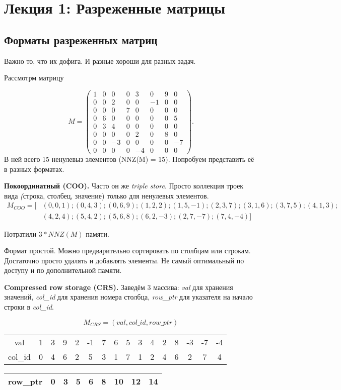 \section{Лекция 1: Разреженные матрицы}

\subsection{Форматы разреженных матриц}

Важно то, что их дофига. И разные хороши для разных задач.

Рассмотрм матрицу 

$$
M=
\begin{pmatrix}
1 & 0 & 0 & 0 & 3 & 0 & 9 & 0 \\
0 & 0 & 2 & 0 & 0 & -1 & 0 & 0 \\
0 & 0 & 0 & 7 & 0 & 0 & 0 & 0 \\
0 & 6 & 0 & 0 & 0 & 0 & 0 & 5 \\
0 & 3 & 4 & 0 & 0 & 0 & 0 & 0 \\
0 & 0 & 0 & 0 & 2 & 0 & 8 & 0 \\
0 & 0 & -3 & 0 & 0 & 0 & 0 & -7 \\
0 & 0 & 0 & 0 & -4 & 0 & 0 & 0 
\end{pmatrix}.
$$
В ней всего 15 ненулевыз элементов (NNZ(M) = 15).
Попробуем представить её в разных форматах.

\textbf{Покоординатный (COO).} Часто он же \textit{triple store}. Просто коллекция троек вида \textit(строка, столбец, значение) только для ненулевых элементов.
\begin{align*}
M_{\textit{COO}} = [&(0,0,1);(0,4,3);(0,6,9);(1,2,2);(1,5,-1);(2,3,7);(3,1,6);(3,7,5);(4,1,3);\\
           &(4,2,4);(5,4,2);(5,6,8); (6,2,-3);(2,7,-7);(7,4,-4) ]
\end{align*}

Потратили $3*NNZ(M)$ памяти.

Формат простой. Можно предварительно сортировать по столбцам или строкам. Достаточно просто удалять и добавлять элементы. Не самый оптимальный по доступу и по дополнительной памяти.

\textbf{Compressed row storage (CRS).} Заведём 3 массива: \textit{val} для хранения значений, \textit{col\_id} для хранения номера столбца, \textit{row\_ptr} для указателя на начало строки в \textit{col\_id}.

\begin{center}
$$
M_{\textit{CRS}} = (\textit{val},\textit{col\_id},\textit{row\_ptr} )
$$
\begin{tabular}{|c||c|c|c|c|c|c|c|c|c|c|c|c|c|c|c|}
\hline
val     & 1 & 3 & 9 & 2 & -1 & 7 & 6 & 5 & 3 & 4 & 2 & 8 & -3 & -7 & -4\\
col\_id & 0 & 4 & 6 & 2 & 5  & 3 & 1 & 7 & 1 & 2 & 4 & 6 & 2  & 7  & 4\\
\hline
\end{tabular}

\begin{tabular}{|c||c|c|c|c|c|c|c|c|}
\hline
row\_ptr & 0 & 3 & 5 & 6 & 8  & 10 & 12 & 14 \\
\hline
\end{tabular}
\end{center}

